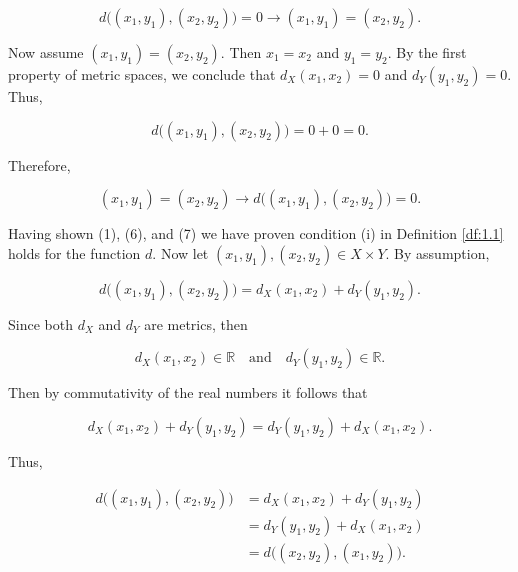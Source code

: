 \documentclass{article}
\makeatletter
\theoremstyle{definition}
\theoremstyle{remark}
\let\oldproofname=\proofname
\renewcommand{\proofname}{\bf{\textit{\oldproofname}}}
\theoremstyle{definition}
\renewenvironment{proof}[1][\proofname]{\par
  \pushQED{\qed}%
  \normalfont \topsep6\p@\@plus6\p@\relax
  \list{}{\leftmargin=0mm
          \rightmargin=0mm
          \settowidth{\itemindent}{\itshape#1}%
          \labelwidth=\itemindent
          \parsep=0pt \listparindent=0mm%
  }
  \item[\hskip\labelsep
        \itshape
    #1\@addpunct{.}]\ignorespaces
}{%
  \popQED\endlist\@endpefalse
}
\makeatother
\begin{document}
\begin{proof}
        \begin{equation}
            d\big((x_1,y_1),(x_2,y_2)\big)=0\rightarrow (x_1,y_1)=(x_2,y_2).
        \end{equation}
        
        Now assume $(x_1,y_1)=(x_2,y_2)$. Then $x_1=x_2$ and $y_1=y_2$. By the first property of metric spaces, we conclude that $d_X(x_1,x_2)=0$ and $d_Y(y_1,y_2)=0$. Thus, 
        
        \begin{equation*}
            d\big((x_1,y_1),(x_2,y_2)\big)=0+0=0.
        \end{equation*}
        
        \noindent Therefore, 
        
        \begin{equation}
            (x_1,y_1)=(x_2,y_2)\rightarrow  d\big((x_1,y_1),(x_2,y_2)\big)=0.
        \end{equation}
        
        \noindent Having shown (1), (6), and (7) we have proven condition (i) in Definition \ref{df:1.1} holds for the function $d$. Now let $(x_1,y_1),(x_2,y_2)\in X\times Y$. By assumption, 
        
        \begin{equation*}
            d\big((x_1,y_1),(x_2,y_2)\big)=d_X(x_1,x_2)+d_Y(y_1,y_2).
        \end{equation*}
        
        \noindent Since both $d_X$ and $d_Y$ are metrics, then 
        
        \begin{equation*}
            d_X(x_1,x_2)\in\mathbb{R}\quad\text{and}\quad d_Y(y_1,y_2)\in\mathbb{R}.
        \end{equation*}
        
        \noindent Then by commutativity of the real numbers it follows that
        
        \begin{equation*}
            d_X(x_1,x_2)+d_Y(y_1,y_2)=d_Y(y_1,y_2)+d_X(x_1,x_2).
        \end{equation*}
        
        \noindent Thus, 
        
        \begin{equation*}
            \begin{split}
                d\big((x_1,y_1),(x_2,y_2)\big)&=d_X(x_1,x_2)+d_Y(y_1,y_2) \\
                &=d_Y(y_1,y_2)+d_X(x_1,x_2) \\
                &= d\big((x_2,y_2),(x_1,y_2)\big).
            \end{split}
        \end{equation*}
        

\end{proof}
\end{document}
